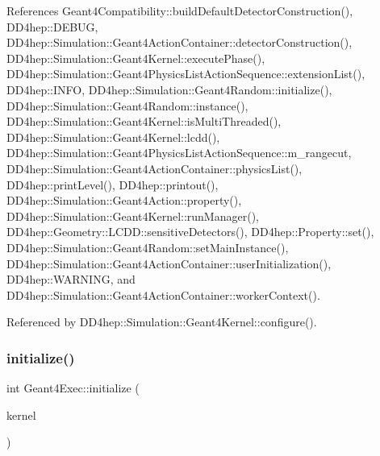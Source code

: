 References Geant4\+Compatibility\+::build\+Default\+Detector\+Construction(), D\+D4hep\+::\+D\+E\+B\+UG, D\+D4hep\+::\+Simulation\+::\+Geant4\+Action\+Container\+::detector\+Construction(), D\+D4hep\+::\+Simulation\+::\+Geant4\+Kernel\+::execute\+Phase(), D\+D4hep\+::\+Simulation\+::\+Geant4\+Physics\+List\+Action\+Sequence\+::extension\+List(), D\+D4hep\+::\+I\+N\+FO, D\+D4hep\+::\+Simulation\+::\+Geant4\+Random\+::initialize(), D\+D4hep\+::\+Simulation\+::\+Geant4\+Random\+::instance(), D\+D4hep\+::\+Simulation\+::\+Geant4\+Kernel\+::is\+Multi\+Threaded(), D\+D4hep\+::\+Simulation\+::\+Geant4\+Kernel\+::lcdd(), D\+D4hep\+::\+Simulation\+::\+Geant4\+Physics\+List\+Action\+Sequence\+::m\+\_\+rangecut, D\+D4hep\+::\+Simulation\+::\+Geant4\+Action\+Container\+::physics\+List(), D\+D4hep\+::print\+Level(), D\+D4hep\+::printout(), D\+D4hep\+::\+Simulation\+::\+Geant4\+Action\+::property(), D\+D4hep\+::\+Simulation\+::\+Geant4\+Kernel\+::run\+Manager(), D\+D4hep\+::\+Geometry\+::\+L\+C\+D\+D\+::sensitive\+Detectors(), D\+D4hep\+::\+Property\+::set(), D\+D4hep\+::\+Simulation\+::\+Geant4\+Random\+::set\+Main\+Instance(), D\+D4hep\+::\+Simulation\+::\+Geant4\+Action\+Container\+::user\+Initialization(), D\+D4hep\+::\+W\+A\+R\+N\+I\+NG, and D\+D4hep\+::\+Simulation\+::\+Geant4\+Action\+Container\+::worker\+Context().



Referenced by D\+D4hep\+::\+Simulation\+::\+Geant4\+Kernel\+::configure().

\hypertarget{class_d_d4hep_1_1_simulation_1_1_geant4_exec_ae5486a8c520af49cbcc5d5ba4323e773}{}\label{class_d_d4hep_1_1_simulation_1_1_geant4_exec_ae5486a8c520af49cbcc5d5ba4323e773} 
\subsubsection{\texorpdfstring{initialize()}{initialize()}}
{\footnotesize\ttfamily int Geant4\+Exec\+::initialize (\begin{DoxyParamCaption}\item[{\hyperlink{class_d_d4hep_1_1_simulation_1_1_geant4_kernel}{Geant4\+Kernel} \&}]{kernel }\end{DoxyParamCaption})\hspace{0.3cm}{\ttfamily [static]}}



